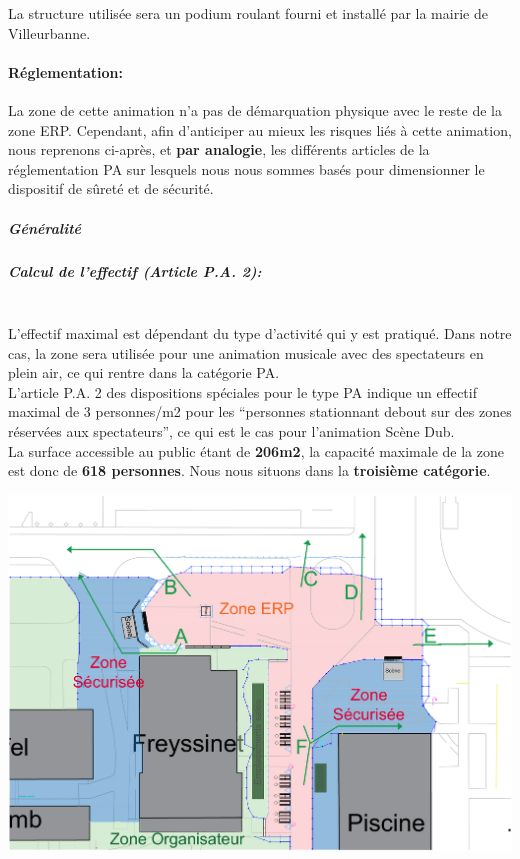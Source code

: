 \documentclass[hidelinks, paper=a4, fontsize=13pt]{report}
\begin{document}
La structure utilisée sera un podium roulant fourni et installé par la mairie de Villeurbanne.

\paragraph{Réglementation:}
La zone de cette animation n'a pas de démarquation physique avec le reste de la zone ERP. Cependant, afin d’anticiper au mieux les risques liés à cette animation, nous reprenons ci-après, et \textbf{par analogie}, les différents articles de la réglementation PA sur lesquels nous nous sommes basés pour dimensionner le dispositif de sûreté et de sécurité. 

\newpage

\subparagraph{Généralité}
\subparagraph*{Calcul de l'effectif (Article P.A. 2):}\mbox{}\\
L’effectif maximal est dépendant du type d’activité qui y est pratiqué. Dans notre cas, la zone sera utilisée pour une animation musicale avec des spectateurs en plein air, ce qui rentre dans la catégorie PA. \\

L’article P.A. 2 des dispositions spéciales pour le type PA indique un effectif maximal de 3 personnes/m2  pour les “personnes stationnant debout sur des zones réservées aux spectateurs”, ce qui est le cas pour l’animation Scène Dub. \\

La surface accessible au public étant de \textbf{206m2}, la capacité maximale de la zone est donc de \textbf{618 personnes}. Nous nous situons dans la \textbf{troisième catégorie}. \\



\begin{center}
	\includegraphics[width=.75\textwidth,keepaspectratio]{Exports/Plan_24h_44eme-3e_Scene_Circ_Autour}
\end{center}
\end{document}
